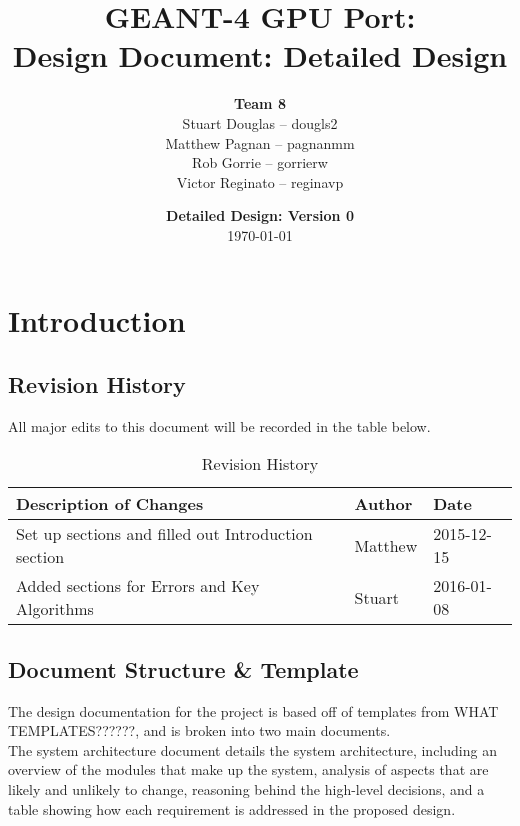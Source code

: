 \documentclass[12pt]{article}
\title{
\LARGE GEANT-4 GPU Port:
\\\vspace{10mm}
\large \textbf{Design Document: Detailed Design}
\vspace{40mm}
}
\author{
\textbf{Team 8}
\\Stuart Douglas -- dougls2
\\Matthew Pagnan -- pagnanmm
\\Rob Gorrie -- gorrierw
\\Victor Reginato -- reginavp
\vspace{10mm}
}
\date{\vfill \textbf{Detailed Design: Version 0}\\ \today}
\begin{document}

\maketitle
\newpage

\renewcommand{\contentsname}{Table of Contents}
\tableofcontents
\newpage
{}

\section{Introduction}
\subsection{Revision History}
All major edits to this document will be recorded in the table below.

\begin{table}[h]
\centering
\caption{Revision History}\label{Table_Revision}
\begin{tabular}{lll}

\toprule
\bf Description of Changes & \bf Author & \bf Date\\\midrule
Set up sections and filled out Introduction section & Matthew & 2015-12-15\\
Added sections for Errors and Key Algorithms & Stuart & 2016-01-08\\
\bottomrule
\end{tabular}
\end{table}

\subsection{Document Structure \& Template}
The design documentation for the project is based off of templates from WHAT TEMPLATES??????, and is broken into two main documents.\\

The system architecture document details the system architecture, including an overview of the modules that make up the system, analysis of aspects that are likely and unlikely to change, reasoning behind the high-level decisions, and a table showing how each requirement is addressed in the proposed design.\\
\end{document}
